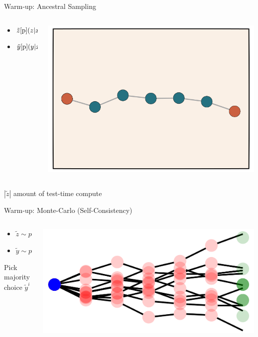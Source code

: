 \documentclass[14pt,aspectratio=169]{beamer}
\begin{document}
\begin{frame}{Warm-up: Ancestral Sampling}
	\begin{columns}
		\begin{column}{0.5\linewidth}
			\begin{itemize}
				\item $\tilde{z} \cite p(z | x)$
				\item $\tilde{y} \cite p(y | x, z=\tilde{z})$
			\end{itemize}
		\end{column}
		\begin{column}{0.5\linewidth}
			\includegraphics[width=\textwidth]{images/ancestral.png}
		\end{column}
	\end{columns}
	$|\tilde{z}|$ amount of test-time compute
\end{frame}

\begin{frame}{Warm-up: Monte-Carlo (Self-Consistency)}
	\begin{columns}
		\begin{column}{0.5\linewidth}
			\begin{itemize}
				\item $\tilde{z} \sim p(z | x)$
				\item $\tilde{y} \sim p(y | x, \tilde{z})$
			\end{itemize}
			Pick majority choice $\tilde{y}^i$
		\end{column}
		\begin{column}{0.5\linewidth}
			\includegraphics[width=\textwidth]{images/bwalk.png}
		\end{column}
	\end{columns}
\end{frame}
\end{document}
